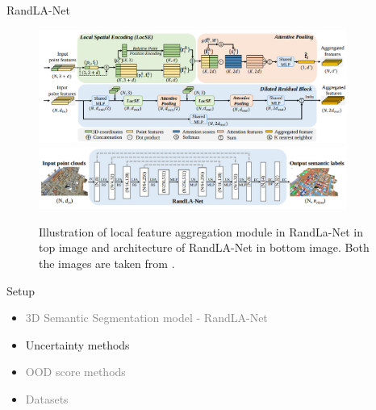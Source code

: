 \documentclass[aspectratio=169]{beamer}
\begin{document}
\begin{frame}{RandLA-Net}
    \begin{figure}
        \centering
        \includegraphics[width = 0.9\textwidth, height=0.37\textheight]{images/randlanet_dires_block.jpg}
        \includegraphics[width = 0.9\textwidth, height=0.37\textheight]{images/randlanet_model.jpg}
        \caption{Illustration of local feature aggregation module in RandLa-Net in top image and architecture of
        RandLA-Net in bottom image. Both the images are taken from \cite{Hu_2020_CVPR_Randla}.}
        \label{fig:randla_model}
    \end{figure}
\end{frame}
\begin{frame}[noframenumbering]{Setup}
    \begin{itemize}
        
        \item \textcolor{gray}{3D Semantic Segmentation model - RandLA-Net}
        \item Uncertainty methods
        \item \textcolor{gray}{OOD score methods}
        \item \textcolor{gray}{Datasets}
    \end{itemize}
\end{frame}
\end{document}

